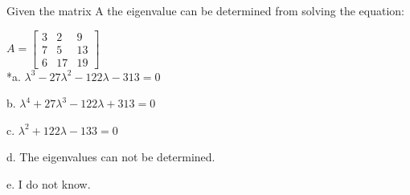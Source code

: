 
Given the matrix A the eigenvalue can be determined from solving the equation:

$
A = \begin{bmatrix}
	3 & 2 & 9 \\
	7 & 5 & 13 \\
	6 & 17 & 19
\end{bmatrix}
$
\\
*a. $\lambda^3  - 27\lambda^2  - 122\lambda - 313 = 0$

b.  $\lambda^4  + 27\lambda^3  - 122\lambda + 313 = 0$

c.  $\lambda^2  + 122\lambda - 133 = 0$

d. The eigenvalues can not be determined.

e. I do not know.\\ 
